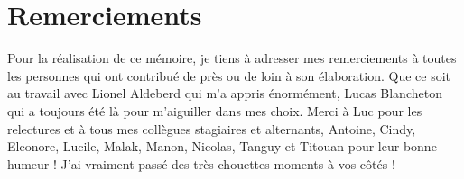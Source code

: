 \chapter*{Remerciements}

Pour la réalisation de ce mémoire, je tiens à adresser mes remerciements à toutes les personnes qui ont contribué de près ou de loin à son élaboration. Que ce soit au travail avec Lionel Aldeberd qui m'a appris énormément, Lucas Blancheton qui a toujours été là pour m'aiguiller dans mes choix. Merci à Luc pour les relectures et à tous mes collègues stagiaires et alternants, Antoine, Cindy, Eleonore, Lucile, Malak, Manon, Nicolas, Tanguy et Titouan pour leur bonne humeur ! J'ai vraiment passé des très chouettes moments à vos côtés !